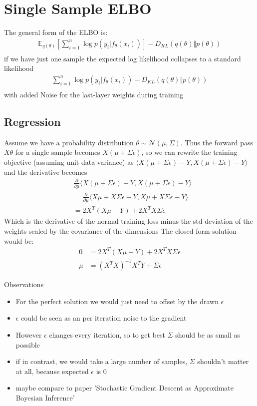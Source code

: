 \documentclass[a4paper]{scrartcl}
\begin{document}
\section{Single Sample ELBO}
  The general form of the ELBO is:
  \begin{align*}
      \mathbb{E}_{q(\theta)}[\sum_{i=1}^n \log{p(y_i \vert f_{\theta}(x_i))}] - D_{KL}(q(\theta) \Vert p(\theta))\\
  \end{align*}
  if we have just one sample the expected log likelihood collapses to a standard likelihood
  \begin{align*}
    \sum_{i=1}^n \log{p(y_i \vert f_{\theta}(x_i))} - D_{KL}(q(\theta) \Vert p(\theta))\\
  \end{align*}
  with added Noise for the last-layer weights during training

  \subsection{Regression}\label{sec:SingleRegression}
    Assume we have a probability distribution $\theta \sim \mathcal{N}(\mu,
    \Sigma)$.
     Thus the forward pass $X\theta$ for a single sample becomes $X
    (\mu + \Sigma \epsilon)$, so we can rewrite the training objective (assuming unit data variance) as
    $\langle X (\mu + \Sigma \epsilon) - Y, X (\mu + \Sigma \epsilon) - Y\rangle$ and the derivative becomes
    \begin{align*}
      &\frac{\partial}{\partial \mu}\langle X (\mu + \Sigma \epsilon) - Y, X (\mu + \Sigma \epsilon) -Y \rangle\\
      &= \frac{\partial}{\partial \mu}\langle X \mu + X\Sigma \epsilon - Y, X \mu + X\Sigma \epsilon -Y \rangle\\
      &= 2X^T(X \mu  - Y) + 2 X^T X \Sigma \epsilon
    \end{align*}
    Which is the derivative of the normal training loss minus the std deviation
    of the weights scaled by the covariance of the dimensions
    The closed form solution would be:
    \begin{align*}
      0 &= 2X^T(X \mu  - Y) + 2 X^T X \Sigma \epsilon\\
      \mu &= (X^T X)^{-1} X^T Y + \Sigma \epsilon
    \end{align*}

    Observations
    \begin{itemize}
      \item For the perfect solution we would just need to offset by the drawn $\epsilon$
      \item $\epsilon$ could be seen as an per iteration noise to the gradient
      \item However $\epsilon$ changes every iteration, so to get best $\Sigma$ should be as small as possible
      \item if in contrast, we would take a large number of samples, $\Sigma$ shouldn't matter at all, because expected $\epsilon$ is 0
      \item maybe compare to paper 'Stochastic Gradient Descent as Approximate Bayesian Inference'
    \end{itemize}
\end{document}

